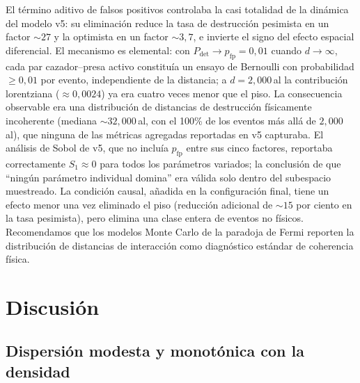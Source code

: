 \documentclass[useAMS,usenatbib,onecolumn]{mn2e}
\begin{document}
El término aditivo de falsos positivos controlaba la casi totalidad de
la dinámica del modelo v5: su eliminación reduce la tasa de destrucción
pesimista en un factor $\sim 27$ y la optimista en un factor
$\sim 3{,}7$, e invierte el signo del efecto espacial diferencial.
El mecanismo es elemental: con
$P_\text{det} \to p_\text{fp} = 0{,}01$ cuando $d \to \infty$, cada par
cazador--presa activo constituía un ensayo de Bernoulli con
probabilidad $\geq 0{,}01$ por evento, independiente de la distancia;
a $d = 2{,}000$\,al la contribución lorentziana ($\approx 0{,}0024$) ya
era cuatro veces menor que el piso.
La consecuencia observable era una distribución de distancias de
destrucción físicamente incoherente (mediana $\sim 32{,}000$\,al, con
el 100\% de los eventos más allá de $2{,}000$\,al), que ninguna de las
métricas agregadas reportadas en v5 capturaba.
El análisis de Sobol de v5, que no incluía $p_\text{fp}$ entre sus
cinco factores, reportaba correctamente $S_1 \approx 0$ para todos los
parámetros variados; la conclusión de que ``ningún parámetro individual
domina'' era válida solo dentro del subespacio muestreado.
La condición causal, añadida en la configuración final, tiene un efecto
menor una vez eliminado el piso (reducción adicional de $\sim 15$ por
ciento en la tasa pesimista), pero elimina una clase entera de eventos
no físicos.
Recomendamos que los modelos Monte Carlo de la paradoja de Fermi
reporten la distribución de distancias de interacción como diagnóstico
estándar de coherencia física.

\section{Discusión}
\label{sec:discussion}

\subsection{Dispersión modesta y monotónica con la densidad}
\end{document}
